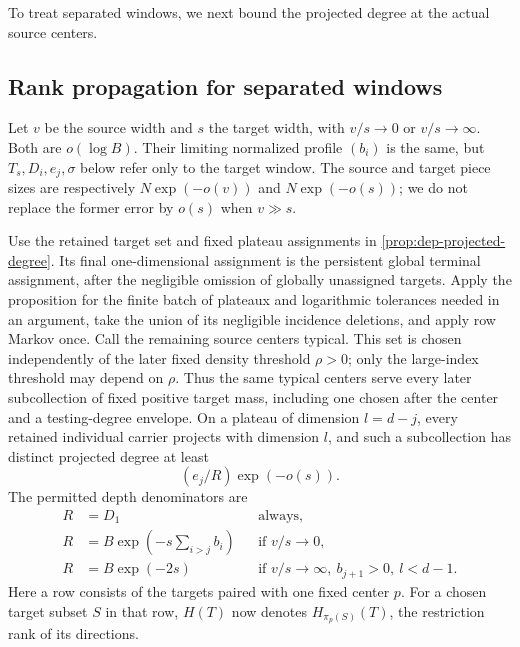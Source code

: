 To treat separated windows, we next bound the projected degree at the actual source centers.



\subsection{Rank propagation for separated windows}

Let $v$ be the source width and $s$ the target width, with $v/s\to0$ or $v/s\to\infty$.  Both are $o(\log B)$. Their limiting normalized profile $(b_i)$ is the same, but $T_s,D_i,e_j,\sigma$ below refer only to the target window. The source and target piece sizes are respectively $N\exp(-o(v))$ and $N\exp(-o(s))$; we do not replace the former error by $o(s)$ when $v\gg s$.

Use the retained target set and fixed plateau assignments in \cref{prop:dep-projected-degree}.  Its final one-dimensional assignment is the persistent global terminal assignment, after the negligible omission of globally unassigned targets.  Apply the proposition for the finite batch of plateaux and logarithmic tolerances needed in an argument, take the union of its negligible incidence deletions, and apply row Markov once.  Call the remaining source centers typical.  This set is chosen independently of the later fixed density threshold $\rho>0$; only the large-index threshold may depend on $\rho$.  Thus the same typical centers serve every later subcollection of fixed positive target mass, including one chosen after the center and a testing-degree envelope.  On a plateau of dimension $l=d-j$, every retained individual carrier projects with dimension $l$, and such a subcollection has distinct projected degree at least
\begin{equation}\label{eq:sc-projected-degree-interface}
 (e_j/R)\exp(-o(s)).
\end{equation}
The permitted depth denominators are
\begin{align}
 R&=D_1 &&\text{always},\label{eq:sc-R-first}\\
 R&=B\exp\left(-s\sum_{i>j}b_i\right)
       &&\text{if }v/s\to0,\label{eq:sc-R-narrow}\\
 R&=B\exp(-2s)
       &&\text{if }v/s\to\infty,\ b_{j+1}>0,
                           \ l<d-1.\label{eq:sc-R-wide}
\end{align}
Here a row consists of the targets paired with one fixed center $p$. For a chosen target subset $S$ in that row, $H(T)$ now denotes $H_{\pi_p(S)}(T)$, the restriction rank of its directions.

